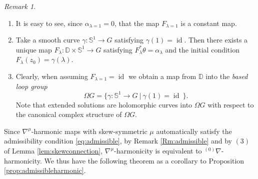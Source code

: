 \documentclass[12pt]{amsart}
\theoremstyle{definition}
\theoremstyle{remark}
\newtheorem{Remark}[Theorem]{Remark}
\numberwithin{equation}{section}
\begin{document}
\begin{Remark}
\mbox{}
\begin{enumerate}
 \item It is easy to see, since $\alpha_{\lambda =1} =0$, 
 that the map $F_{\lambda =1}$ is a constant map.

\item Take a smooth curve $\gamma:\mathbb{S}^1\to G$ 
 satisfying $\gamma(1)={\operatorname{id}}$.
 Then there exists a unique map $F_\lambda :\mathbb{D}\times 
 \mathbb{S}^1\to G$ satisfying $F_{\lambda}^{*}\theta
 =\alpha_{\lambda}$ and 
 the initial condition $F_{\lambda}(z_0)=\gamma(\lambda)$.

\item  Clearly, when assuming $F_{\lambda=1} = {\operatorname{id}}$ we obtain a map
 from $\mathbb{D}$ into the \textit{based loop group}
\begin{equation*}
 \Omega{G}=\{\gamma:\mathbb{S}^1\to G\ \vert \ \gamma(1)={\operatorname{id}} \>\}.
\end{equation*}
 Note that extended solutions are holomorphic curves into 
 $\Omega G$ with respect to the canonical complex structure 
 of $\Omega G$.
\end{enumerate}
\end{Remark}
 Since ${\nabla^{\mu}}$-harmonic maps with skew-symmetric $\mu$ 
 automatically satisfy 
 the admissibility condition 
 \eqref{eq:admissible}, by Remark \ref{Rm:admissible} and 
 by $(3)$ of Lemma \ref{lem:skewconnection}, ${\nabla^{\mu}}$-harmonicity is equivalent 
 to ${{}^{(0)}\nabla}$-harmonicity. 
 We thus  have the following theorem as a corollary 
 to Proposition \ref{prop:admissibleharmonic}.
\end{document}
